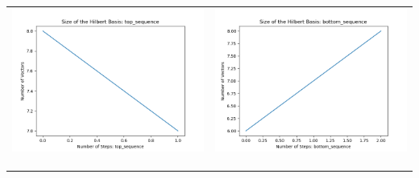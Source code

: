 \documentclass[10pt]{article}
\begin{document}
\begin{tabular}{c|c}
\begin{minipage}{.4\textwidth}
\includegraphics[width=\textwidth]{"DATA/5d/5 generators 1 bound A/top_sequence SIZE"}
\end{minipage} &
\begin{minipage}{.4\textwidth}
\includegraphics[width=\textwidth]{"DATA/5d/5 generators 1 bound A bottomup/bottom_sequence SIZE"}
\end{minipage} \\ \\
\hline \\\begin{minipage}{.4\textwidth}

\end{minipage}
\end{tabular}
\end{document}
